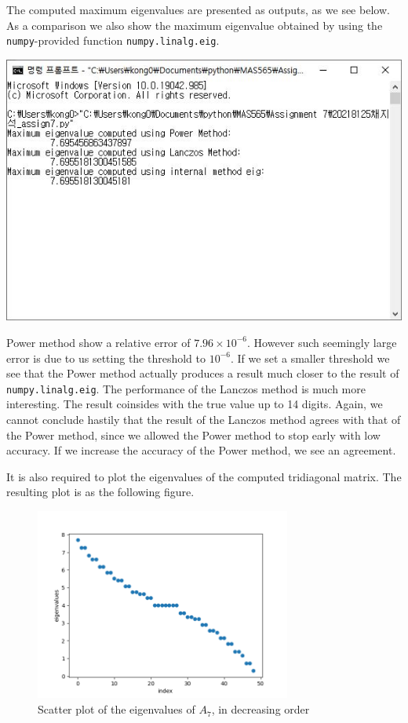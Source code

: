 \documentclass{article}
\begin{document}
The computed maximum eigenvalues are presented as outputs, as we see below. As a comparison we also show the maximum eigenvalue obtained by using the \texttt{numpy}-provided function \texttt{numpy.linalg.eig}.
\begin{center}
    \includegraphics[width=0.75\linewidth]{console.JPG}
\end{center} Power method show a relative error of $7.96\times 10^{-6}$. However such seemingly large error is due to us setting the threshold to $10^{-6}$. If we set a smaller threshold we see that the Power method actually produces a result much closer to the result of \texttt{numpy.linalg.eig}. The performance of the Lanczos method is much more interesting. The result coinsides with the true value up to 14 digits. Again, we cannot conclude hastily that the result of the Lanczos method agrees with that of the Power method, since we allowed the Power method to stop early with low accuracy. If we increase the accuracy of the Power method, we see an agreement. 

It is also required to plot the eigenvalues of the computed tridiagonal matrix. The resulting plot is as the following figure. 
\begin{figure}[th]
  \centering
  \includegraphics[width=0.75\textwidth]{3313.png}
  \caption{Scatter plot of the eigenvalues of $A_7$, in decreasing order}
  \label{fig:mean and std of net14}
\end{figure}
  
\end{document}
